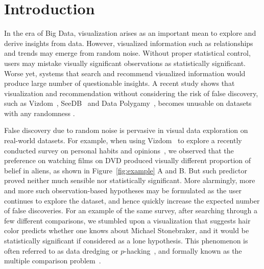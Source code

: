 \section{Introduction}
\label{sec:intro}
 In the era of Big Data, visualization arises as an important mean to explore and derive insights from data.  However, visualized information such as relationships and trends may emerge from random noise.  Without proper statistical control, users may mistake visually significant observations as statistically significant.  Worse yet, systems that search and recommend visualized information would produce large number of questionable insights.  
A recent study shows that visualization and recommendation without considering the risk of false discovery, such as Vizdom~\cite{vizdom}, SeeDB~\cite{seedb} and Data Polygamy~\cite{polygamy}, becomes unusable on datasets with any randomness \cite{binnig2017sustainable}.

False discovery due to random noise is pervasive in visual data exploration on real-world datasets. For example, when using Vizdom~\cite{vizdom} to explore a recently conducted survey on personal habits and opinions~\cite{binnig2017sustainable}, we observed that the preference on watching films on DVD produced visually different proportion of belief in aliens, as shown in Figure~\ref{fig:example} A and B.  But such predictor proved neither much sensible nor statistically significant.  More alarmingly, more and more such observation-based hypotheses may be formulated as the user continues to explore the dataset, and hence quickly increase the expected number of false discoveries. For an example of the same survey, after searching through a few different comparisons, we stumbled upon a visualization that suggests hair color predicts whether one knows about Michael Stonebraker, and it would be statistically significant if considered as a lone hypothesis. This phenomenon is often referred to as data dredging or $p$-hacking~\cite{head2015extent}, and formally known as the multiple comparison problem~\cite{shaffer1995multiple}.

